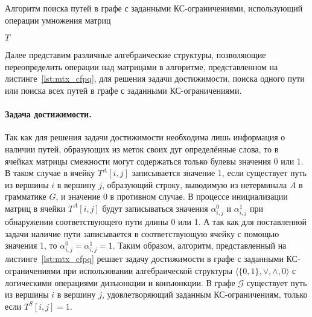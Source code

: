 \begin{algorithm}
	\begin{algorithmic}[1]
		\caption{Алгоритм поиска путей в графе с заданными КС-ограничениями, использующий операции умножения матриц}
		\label{lst:mtx_cfpq}
		
		 
		\EndFor
		 
		\EndFor
		\EndFor
		
		\EndFor
		\EndWhile
		\State \Return $T$
		\EndFunction
		
	\end{algorithmic}
\end{algorithm}

Далее представим различные алгебраические структуры, позволяющие переопределить операции над матрицами в алгоритме, представленном на листинге~\ref{lst:mtx_cfpq}, для решения задачи достижимости, поиска одного пути или поиска всех путей в графе с заданными КС-ограничениями.

\paragraph{Задача достижимости.} Так как для решения задачи достижимости необходима лишь информация о наличии путей, образующих из меток своих дуг определённые слова, то в ячейках матрицы смежности могут содержаться только булевы значения 0 или 1. В таком случае в ячейку $T^A[i, j]$ записывается значение 1, если существует путь из вершины $i$ в вершину $j$, образующий строку, выводимую из нетерминала $A$ в грамматике $G$, и значение 0 в противном случае. В процессе инициализации матриц в ячейки $T^A[i, j]$ будут записываться значения $\alpha^0_{i, j}$ и $\alpha^1_{i, j}$ при обнаружении соответствующего пути длины 0 или 1. А так как для поставленной задачи наличие пути записывается в соответствующую ячейку с помощью значения 1, то $\alpha^0_{i, j} = \alpha^1_{i, j} = 1$. Таким образом, алгоритм, представленный на листинге~\ref{lst:mtx_cfpq} решает задачу достижимости в графе с заданными КС-ограничениями при использовании алгебраической структуры $\langle \{0, 1\}, \vee, \wedge, 0 \rangle$ с логическими операциями дизъюнкции и конъюнкции. В графе $\mathcal{G}$ существует путь из вершины $i$ в вершину $j$, удовлетворяющий заданным КС-ограничениям, только если $T^S[i, j] = 1$.

